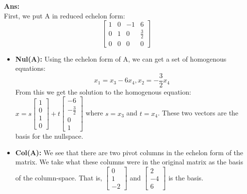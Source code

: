 \documentclass[12pt,oneside]{amsart}
\newcommand\sol[1]{
\medskip
\begin{mdframed}
\textbf{Ans:\\} #1
\end{mdframed}
\medskip
}
\newcommand{\vd}[3]{\left[\begin{matrix} #1 \\ #2 \\ #3 \end{matrix}\right]}
\newcommand{\vf}[4]{\left[\begin{matrix} #1 \\ #2 \\ #3 \\ #4 \end{matrix}\right]}
\begin{document}
\begin{enumerate}
\sol{
  First, we put A in reduced echelon form:
  $$\left[\begin{array}{rrrr}
1 & 0 & -1 & 6 \\
0 & 1 & 0 & \frac{3}{2} \\
0 & 0 & 0 & 0
\end{array}\right]$$
  \begin{itemize}
    \item \textbf{Nul(A):} Using the echelon form of A, we can get a set of homogenous equations:
      $$x_1=x_3-6x_4, x_2=-\frac{3}{2}x_4$$
      From this we get the solution to the homogenous equation: $x=s\vf{1}{0}{1}{0}+t\vf{-6}{-\frac{3}{2}}{0}{1}$ where $s=x_3$ and $t=x_4$.
      These two vectors are the basis for the nullspace.
    \item \textbf{Col(A):}
      We see that there are two pivot columns in the echelon form of the matrix. We take what these columns were in the original matrix as the basis of the column-space. That is, $\vd{0}{1}{-2}$ and $\vd{2}{-4}{6}$ is the basis. 
  \end{itemize}
}

\end{enumerate}
\end{document}
